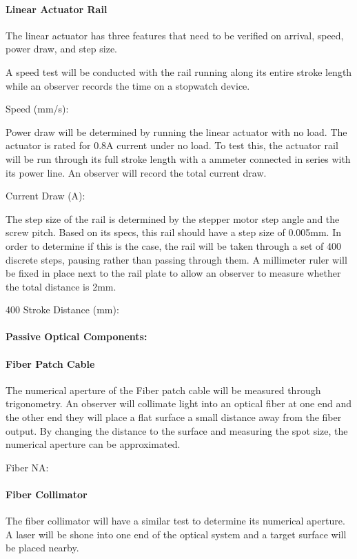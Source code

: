 \paragraph{Linear Actuator Rail} The linear actuator has three features that need to be verified on arrival, speed, power draw, and step size. 
\bigskip

A speed test will be conducted with the rail running along its entire stroke length while an observer records the time on a stopwatch device.
\bigskip

Speed (mm/s):
\bigskip

Power draw will be determined by running the linear actuator with no load. The actuator is rated for 0.8A current under no load. To test this, the actuator rail will be run through its full stroke length with a ammeter connected in series with its power line. An observer will record the total current draw.
\bigskip

Current Draw (A):
\bigskip

The step size of the rail is determined by the stepper motor step angle and the screw pitch. Based on its specs, this rail should have a step size of 0.005mm. In order to determine if this is the case, the rail will be taken through a set of 400 discrete steps, pausing rather than passing through them. A millimeter ruler will be fixed in place next to the rail plate to allow an observer to measure whether the total distance is 2mm.
\bigskip

400 Stroke Distance (mm):

\paragraph{Passive Optical Components:}

\paragraph{Fiber Patch Cable} The numerical aperture of the Fiber patch cable will be measured through trigonometry. An observer will collimate light into an optical fiber at one end and the other end they will place a flat surface a small distance away from the fiber output. By changing the distance to the surface and measuring the spot size, the numerical aperture can be approximated.
\bigskip

Fiber NA:
\bigskip

\paragraph{Fiber Collimator} The fiber collimator will have a similar test to determine its numerical aperture. A laser will be shone into one end of the optical system and a target surface will be placed nearby.
\bigskip

